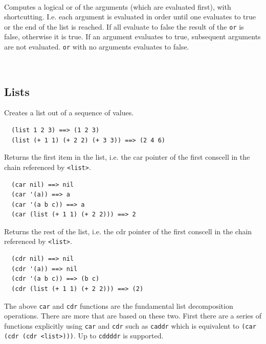 \documentclass[12pt]{article}
\begin{document}
\begin{verbatim}
  
\end{verbatim}


Computes a logical or of the arguments (which are evaluated first),
with shortcutting. I.e. each argument is evaluated in order until one
evaluates to true or the end of the list is reached. If all evaluate
to false the result of the \verb|or| is false, otherwise it is true.
If an argument evaluates to true, subsequent arguments are not
evaluated. \verb|or| with no arguments evaluates to false.

\begin{verbatim}
  
\end{verbatim}

\subsection{Lists}


Creates a list out of a sequence of values.

\begin{verbatim}
  (list 1 2 3) ==> (1 2 3)
  (list (+ 1 1) (+ 2 2) (+ 3 3)) ==> (2 4 6)
\end{verbatim}


Returns the first item in the list, i.e. the car pointer of the first
conscell in the chain referenced by \verb|<list>|.

\begin{verbatim}
  (car nil) ==> nil
  (car '(a)) ==> a
  (car '(a b c)) ==> a
  (car (list (+ 1 1) (+ 2 2))) ==> 2
\end{verbatim}


Returns the rest of the list, i.e. the cdr pointer of the first
conscell in the chain referenced by \verb|<list>|.

\begin{verbatim}
  (cdr nil) ==> nil
  (cdr '(a)) ==> nil
  (cdr '(a b c)) ==> (b c)  
  (cdr (list (+ 1 1) (+ 2 2))) ==> (2)
\end{verbatim}

The above \verb|car| and \verb|cdr| functions are the fundamental list
decomposition operations. There are more that are based on these two.
First there are a series of functions explicitly using \verb|car| and
\verb|cdr| such as \verb|caddr| which is equivalent to
\verb|(car (cdr (cdr <list>)))|. Up to \verb|cddddr| is supported.
\end{document}
